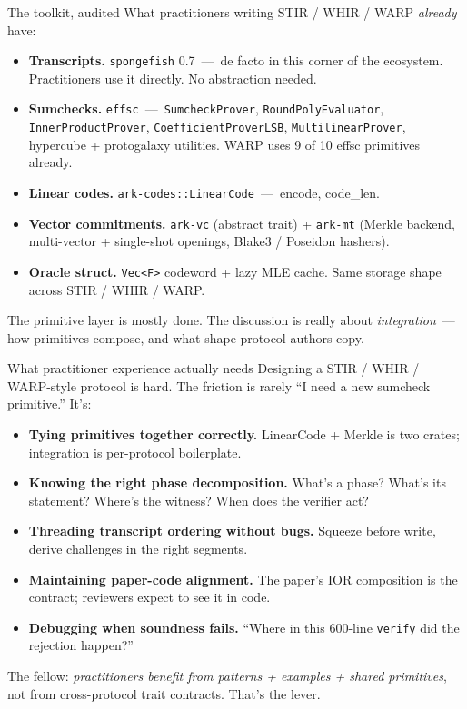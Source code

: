 \documentclass[10pt,aspectratio=169]{beamer}
\begin{document}
\begin{frame}{The toolkit, audited}
What practitioners writing STIR / WHIR / WARP \emph{already} have:
\begin{itemize}\small
  \item \textbf{Transcripts.} \texttt{spongefish} 0.7 \,---\, de facto in this corner of the ecosystem. Practitioners use it directly. No abstraction needed.
  \item \textbf{Sumchecks.} \texttt{effsc} \,---\, \texttt{SumcheckProver}, \texttt{RoundPolyEvaluator}, \texttt{InnerProductProver}, \texttt{CoefficientProverLSB}, \texttt{MultilinearProver}, hypercube + protogalaxy utilities. WARP uses 9 of 10 effsc primitives already.
  \item \textbf{Linear codes.} \texttt{ark-codes::LinearCode} \,---\, encode, code\_len.
  \item \textbf{Vector commitments.} \texttt{ark-vc} (abstract trait) + \texttt{ark-mt} (Merkle backend, multi-vector + single-shot openings, Blake3 / Poseidon hashers).
  \item \textbf{Oracle struct.} \texttt{Vec<F>} codeword + lazy MLE cache. Same storage shape across STIR / WHIR / WARP.
\end{itemize}

\vspace{0.4em}
The primitive layer is mostly done. The discussion is really about \emph{integration} \,---\, how primitives compose, and what shape protocol authors copy.
\end{frame}

\begin{frame}{What practitioner experience actually needs}
Designing a STIR / WHIR / WARP-style protocol is hard. The friction is rarely ``I need a new sumcheck primitive.'' It's:
\begin{itemize}\small
  \item \textbf{Tying primitives together correctly.} LinearCode + Merkle is two crates; integration is per-protocol boilerplate.
  \item \textbf{Knowing the right phase decomposition.} What's a phase? What's its statement? Where's the witness? When does the verifier act?
  \item \textbf{Threading transcript ordering without bugs.} Squeeze before write, derive challenges in the right segments.
  \item \textbf{Maintaining paper-code alignment.} The paper's IOR composition is the contract; reviewers expect to see it in code.
  \item \textbf{Debugging when soundness fails.} ``Where in this 600-line \texttt{verify} did the rejection happen?''
\end{itemize}

\vspace{0.4em}
The fellow: \emph{practitioners benefit from patterns + examples + shared primitives}, not from cross-protocol trait contracts. That's the lever.
\end{frame}
\end{document}
